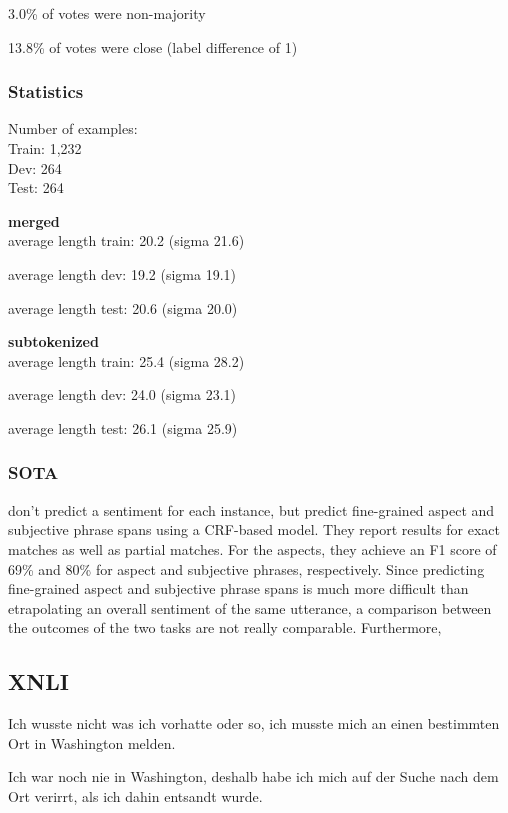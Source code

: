 3.0\% of votes were non-majority

13.8\% of votes were close (label difference of 1)

\subsubsection{Statistics}

Number of examples: \\
Train: 1,232 \\
Dev: 264 \\
Test: 264

\textbf{merged} \\
average length train: 20.2 (sigma 21.6)

average length dev: 19.2 (sigma 19.1)

average length test: 20.6 (sigma 20.0)

\textbf{subtokenized} \\

average length train: 25.4 (sigma 28.2)

average length dev: 24.0 (sigma 23.1)

average length test: 26.1 (sigma 25.9)

\subsubsection{SOTA}

\cite{sanger2016scare} don't predict a sentiment for each instance, but predict fine-grained aspect and subjective phrase spans using a CRF-based model.
They report results for exact matches as well as partial matches.
For the aspects, they achieve an F1 score of 69\% and 80\% for aspect and subjective phrases, respectively.
Since predicting fine-grained aspect and subjective phrase spans is much more difficult than etrapolating an overall sentiment of the same utterance, a comparison between the outcomes of the two tasks are not really comparable.
Furthermore, 

\subsection{XNLI}

\cite{conneau2018xnli}


\begin{examples}
	\label{ex:xnli}
	\item Ich wusste nicht was ich vorhatte oder so, ich musste mich an einen bestimmten Ort in Washington melden.

        Ich war noch nie in Washington, deshalb habe ich mich auf der Suche nach dem Ort verirrt, als ich dahin entsandt wurde.
\end{examples}

